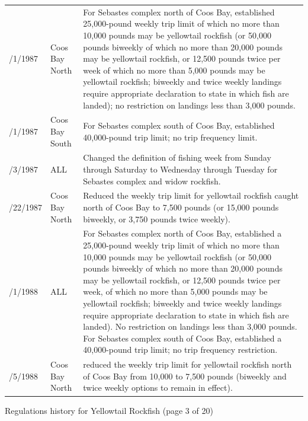 \documentclass[12pt,]{article}
\begin{document}
\begin{tabular}{>{\centering}p{.60in}>{\centering}p{1.0in}>{\raggedright}p{4.20in}}
  1/1/1987 & Coos Bay North & For Sebastes complex north of Coos Bay, established 25,000-pound weekly trip limit of which no more than 10,000 pounds may be yellowtail rockfish (or 50,000 pounds biweekly of which no more than 20,000 pounds may be yellowtail rockfish, or 12,500 pounds twice per week of which no more than 5,000 pounds may be yellowtail rockfish; biweekly and twice weekly landings require appropriate declaration to state in which fish are landed); no restriction on landings less than 3,000 pounds.  \\ 
  1/1/1987 & Coos Bay South & For Sebastes complex south of Coos Bay, established 40,000-pound trip limit; no trip frequency limit.  \\ 
  5/3/1987 & ALL & Changed the definition of fishing week from Sunday through Saturday to Wednesday through Tuesday for Sebastes complex and widow rockfish. \\ 
  7/22/1987 & Coos Bay North & Reduced the weekly trip limit for yellowtail rockfish caught north of Coos Bay to 7,500 pounds (or 15,000 pounds biweekly, or 3,750 pounds twice weekly).  \\ 
  1/1/1988 & ALL & For Sebastes complex north of Coos Bay, established a 25,000-pound weekly trip limit of which no more than 10,000 pounds may be yellowtail rockfish (or 50,000 pounds biweekly of which no more than 20,000 pounds may be yellowtail rockfish, or 12,500 pounds twice per week, of which no more than 5,000 pounds may be yellowtail rockfish; biweekly and twice weekly landings require appropriate declaration to state in which fish are landed). No restriction on landings less than 3,000 pounds. For Sebastes complex south of Coos Bay, established a 40,000-pound trip limit; no trip frequency restriction.  \\ 
  10/5/1988 & Coos Bay North & reduced the weekly trip limit for yellowtail rockfish north of Coos Bay from 10,000 to 7,500 pounds (biweekly and twice weekly options to remain in effect).  \\ 
   \hline
\end{tabular}

\endgroup
\newpage
Regulations history for Yellowtail Rockfish (page 3 of 20)
\begingroup\fontsize{9pt}{10pt}\selectfont
\end{document}
